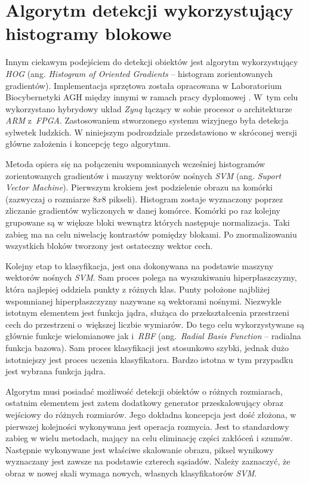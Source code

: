 \section{Algorytm detekcji wykorzystujący histogramy blokowe}
\label{sec:hog_svn}

Innym ciekawym podejściem do detekcji obiektów jest algorytm wykorzystujący \textit{HOG} (ang. \textit{Histogram of Oriented Gradients} -- histogram zorientowanych gradientów). Implementacja sprzętowa została opracowana w Laboratorium Biocybernetyki AGH między innymi w ramach pracy dyplomowej \cite{kotarba_15}. W~tym celu wykorzystano hybrydowy układ \textit{Zynq} łączący w sobie procesor o architekturze \textit{ARM} z~\textit{FPGA}. Zastosowaniem stworzonego systemu wizyjnego była detekcja sylwetek ludzkich. W niniejszym podrozdziale przedstawiono w skróconej wersji główne założenia i koncepcję tego algorytmu.

Metoda opiera się na połączeniu wspomnianych wcześniej histogramów zorientowanych gradientów i maszyny wektorów nośnych \textit{SVM} (ang. \textit{Suport Vector Machine}). Pierwszym krokiem jest podzielenie obrazu na komórki (zazwyczaj o rozmiarze $8x8$ pikseli). Histogram zostaje wyznaczony poprzez zliczanie gradientów wyliczonych w danej komórce. Komórki po raz kolejny grupowane są w większe bloki wewnątrz których następuje normalizacja. Taki zabieg ma na celu niwelację kontrastów pomiędzy blokami. Po znormalizowaniu wszystkich bloków tworzony jest ostateczny wektor cech.

Kolejny etap to klasyfikacja, jest ona dokonywana na podstawie maszyny wektorów nośnych \textit{SVM}. Sam proces polega na wyszukiwaniu hiperpłaszczyzny, która najlepiej oddziela punkty z różnych klas. Punty położone najbliżej wspomnianej hiperpłaszczyzny nazywane są wektorami nośnymi. Niezwykle istotnym elementem jest funkcja jądra, służąca do przekształcenia przestrzeni cech do przestrzeni o~większej liczbie wymiarów. Do tego celu wykorzystywane są głównie funkcje wielomianowe jak i~\textit{RBF} (ang.~\textit{Radial Basis Function} -- radialna funkcja bazowa). Sam proces klasyfikacji jest stosunkowo szybki, jednak dużo istotniejszy jest proces uczenia klasyfikatora. Bardzo istotna w tym przypadku jest wybrana funkcja jądra. 

Algorytm musi posiadać możliwość detekcji obiektów o różnych rozmiarach, ostatnim elementem jest zatem dodatkowy generator przeskalowujący obraz wejściowy do różnych rozmiarów. Jego dokładna koncepcja jest dość złożona, w pierwszej kolejności wykonywana jest operacja rozmycia. Jest to standardowy zabieg w wielu metodach, mający na celu eliminację części zakłóceń i szumów. Następnie wykonywane jest właściwe skalowanie obrazu, piksel wynikowy wyznaczany jest zawsze na podstawie czterech sąsiadów. Należy zaznaczyć, że obraz w nowej skali wymaga nowych, własnych klasyfikatorów \textit{SVM}.


